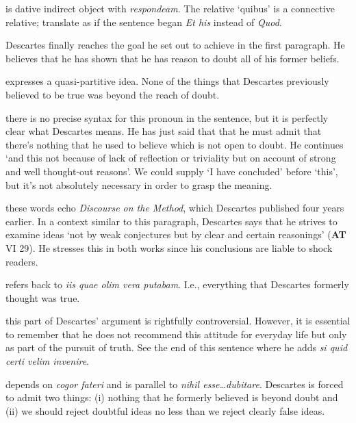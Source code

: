  is dative indirect object with \textit{respondeam}. The relative `quibus' is a connective relative; translate as if the sentence began \textit{Et his} instead of \textit{Quod}.

 Descartes finally reaches the goal he set out to achieve in the first paragraph. He believes that he has shown that he has reason to doubt all of his former beliefs.

 expresses a quasi-partitive idea. None of the things that Descartes previously believed to be true was beyond the reach of doubt.

 there is no precise syntax for this pronoun in the sentence, but it is perfectly clear what Descartes means. He has just said that that he must admit that there's nothing that he used to believe which is not open to doubt. He continues `and this not because of lack of reflection or triviality but on account of strong and well thought-out reasons'. We could supply `I have concluded' before `this', but it's not absolutely necessary in order to grasp the meaning.

 these words echo \textit{Discourse on the Method}, which Descartes published four years earlier. In a context similar to this paragraph, Descartes says that he strives to examine ideas `not by weak conjectures but by clear and certain reasonings' (\textbf{AT} VI 29). He stresses this in both works since his conclusions are liable to shock readers.

 refers back to \textit{iis quae olim vera putabam}. I.e., everything that Descartes formerly thought was true.

 this part of Descartes' argument is rightfully controversial. However, it is essential to remember that he does not recommend this attitude for everyday life but only as part of the pursuit of truth. See the end of this sentence where he adds \textit{si quid certi velim invenire}.

 depends on \textit{cogor fateri} and is parallel to \textit{nihil esse\dots dubitare}. Descartes is forced to admit two things: (i) nothing that he formerly believed is beyond doubt and (ii) we should reject doubtful ideas no less than we reject clearly false ideas.



